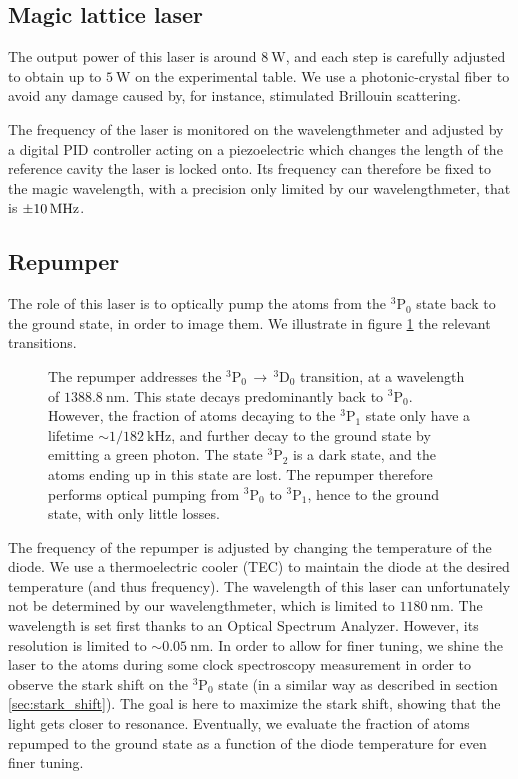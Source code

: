 \documentclass[11pt]{article}
\numberwithin{equation}{section}
\numberwithin{figure}{section}
\begin{document}
\subsection*{Magic lattice laser}

The output power of this laser is around $\SI{8}{\watt}$, and each step is carefully adjusted to obtain up to $\SI{5}{\watt}$ on the experimental table. We use a photonic-crystal fiber to avoid any damage caused by, for instance, stimulated Brillouin scattering.

The frequency of the laser is monitored on the wavelengthmeter and adjusted by a digital PID controller acting on a piezoelectric which changes the length of the reference cavity the laser is locked onto. Its frequency can therefore be fixed to the magic wavelength, with a precision only limited by our wavelengthmeter, that is $\SI{\pm10}{\mega\hertz}$.

\subsection*{Repumper} 
The role of this laser is to optically pump the atoms from the $^3$P$_0$ state back to the ground state, in order to image them. We illustrate in figure \ref{fig:repumper} the relevant transitions.

%
\begin{figure}[htbp]
	\centering
	\def\svgwidth{0.5\linewidth}
    
    \caption{\small The repumper addresses the $^3$P$_0 \, \rightarrow \, ^3$D$_0$ transition, at a wavelength of $\SI{1388.8}{\nano\metre}$. This state decays predominantly back to $^3$P$_0$. However, the fraction of atoms decaying to the $^3$P$_1$ state only have a lifetime $\sim 1/\SI{182}{\kilo\hertz}$, and further decay to the ground state by emitting a green photon. The state $^3$P$_2$ is a dark state, and the atoms ending up in this state are lost. The repumper therefore performs optical pumping from $^3$P$_0$ to $^3$P$_1$, hence to the ground state, with only little losses.}
    \label{fig:repumper}
\end{figure}
%

The frequency of the repumper is adjusted by changing the temperature of the diode. We use a thermoelectric cooler (TEC) to maintain the diode at the desired temperature (and thus frequency).
The wavelength of this laser can unfortunately not be determined by our wavelengthmeter, which is limited to $\SI{1180}{\nano\metre}$. The wavelength is set first thanks to an Optical Spectrum Analyzer. However, its resolution is limited to $\sim \SI{0.05}{\nano\metre}$. In order to allow for finer tuning, we shine the laser to the atoms during some clock spectroscopy measurement in order to observe the stark shift on the $^3$P$_0$ state (in a similar way as described in section \ref{sec:stark_shift}). The goal is here to maximize the stark shift, showing that the light gets closer to resonance. Eventually, we evaluate the fraction of atoms repumped to the ground state as a function of the diode temperature for even finer tuning.
\end{document}
